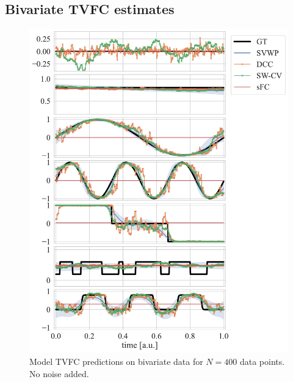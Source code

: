 \subsection{Bivariate TVFC estimates}\label{ch:appendix-d2-impact-of-noise}


\begin{figure}[h]
  \centering
  \includegraphics[width=\textwidth]{fig/sim/d2/N0400_T0200/no_noise/all_covs_types_correlations}
  \caption{
    Model TVFC predictions on bivariate data for $N = 400$ data points.
    No noise added.
  }\label{fig:results-all-covariance-structures-tvfc-predictions}
\end{figure}


